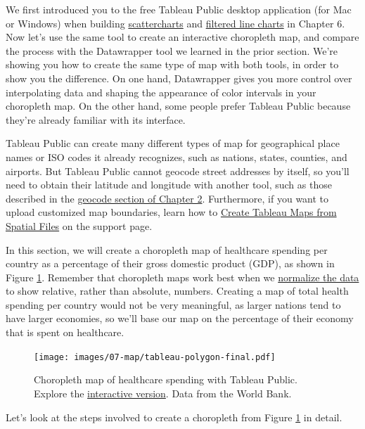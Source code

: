 \documentclass[
  english,
]{book}
\begin{document}
We first introduced you to the free Tableau Public desktop application (for Mac or Windows) when building \href{scatter-tableau.html}{scattercharts} and \href{filtered-line-tableau.html}{filtered line charts} in Chapter 6. Now let's use the same tool to create an interactive choropleth map, and compare the process with the Datawrapper tool we learned in the prior section. We're showing you how to create the same type of map with both tools, in order to show you the difference. On one hand, Datawrapper gives you more control over interpolating data and shaping the appearance of color intervals in your choropleth map. On the other hand, some people prefer Tableau Public because they're already familiar with its interface.

Tableau Public can create many different types of map for geographical place names or ISO codes it already recognizes, such as nations, states, counties, and airports. But Tableau Public cannot geocode street addresses by itself, so you'll need to obtain their latitude and longitude with another tool, such as those described in the \href{geocode.html}{geocode section of Chapter 2}. Furthermore, if you want to upload customized map boundaries, learn how to \href{https://help.tableau.com/current/pro/desktop/en-us/maps_shapefiles.htm}{Create Tableau Maps from Spatial Files}
on the support page.

In this section, we will create a choropleth map of healthcare spending per country as a percentage of their gross domestic product (GDP), as shown in Figure \ref{fig:tableau-polygon-final}. Remember that choropleth maps work best when we \href{normalize-choropleth.html}{normalize the data} to show relative, rather than absolute, numbers. Creating a map of total health spending per country would not be very meaningful, as larger nations tend to have larger economies, so we'll base our map on the percentage of their economy that is spent on healthcare.



\begin{figure}
\centering
\texttt{[image: images/07-map/tableau-polygon-final.pdf]}
\caption{\label{fig:tableau-polygon-final}Choropleth map of healthcare spending with Tableau Public. Explore the \href{https://public.tableau.com/profile/ilya7257\#!/vizhome/2017HealthcareSpendingbyCountryasofGDP/Dashboard1}{interactive version}. Data from the World Bank.}
\end{figure}

Let's look at the steps involved to create a choropleth from Figure \ref{fig:tableau-polygon-final} in detail.
\end{document}
